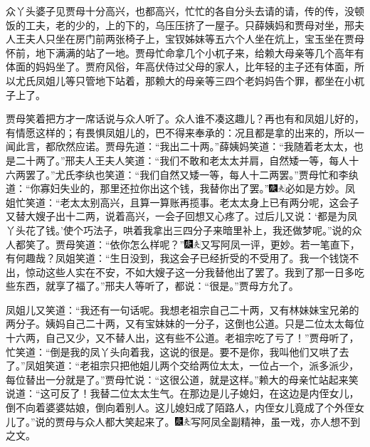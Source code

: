 众丫头婆子见贾母十分高兴，也都高兴，忙忙的各自分头去请的请，传的传，没顿饭的工夫，老的少的，上的下的，乌压压挤了一屋子。只薛姨妈和贾母对坐，邢夫人王夫人只坐在房门前两张椅子上，宝钗姊妹等五六个人坐在炕上，宝玉坐在贾母怀前，地下满满的站了一地。贾母忙命拿几个小杌子来，给赖大母亲等几个高年有体面的妈妈坐了。贾府风俗，年高伏侍过父母的家人，比年轻的主子还有体面，所以尤氏凤姐儿等只管地下站着，那赖大的母亲等三四个老妈妈告个罪，都坐在小杌子上了。

贾母笑着把方才一席话说与众人听了。众人谁不凑这趣儿？再也有和凤姐儿好的，有情愿这样的；有畏惧凤姐儿的，巴不得来奉承的：况且都是拿的出来的，所以一闻此言，都欣然应诺。贾母先道：“我出二十两。”薛姨妈笑道：“我随着老太太，也是二十两了。”邢夫人王夫人笑道：“我们不敢和老太太并肩，自然矮一等，每人十六两罢了。”尤氏李纨也笑道：“我们自然又矮一等，每人十二两罢。”贾母忙和李纨道：“你寡妇失业的，那里还拉你出这个钱，我替你出了罢。”{\includegraphics[width=3mm]{../Images/00004}\includegraphics[width=3mm]{../Images/00012}\footnotesize \kaishu 必如是方妙。}凤姐忙笑道：“老太太别高兴，且算一算账再揽事。老太太身上已有两分呢，这会子又替大嫂子出十二两，说着高兴，一会子回想又心疼了。过后儿又说：‘都是为凤丫头花了钱。’使个巧法子，哄着我拿出三四分子来暗里补上，我还做梦呢。”说的众人都笑了。贾母笑道：“依你怎么样呢？”{\includegraphics[width=3mm]{../Images/00004}\includegraphics[width=3mm]{../Images/00012}\footnotesize \kaishu 又写阿凤一评，更妙。若一笔直下，有何趣哉？}凤姐笑道：“生日没到，我这会子已经折受的不受用了。我一个钱饶不出，惊动这些人实在不安，不如大嫂子这一分我替他出了罢了。我到了那一日多吃些东西，就享了福了。”邢夫人等听了，都说：“很是。”贾母方允了。

凤姐儿又笑道：“我还有一句话呢。我想老祖宗自己二十两，又有林妹妹宝兄弟的两分子。姨妈自己二十两，又有宝妹妹的一分子，这倒也公道。只是二位太太每位十六两，自己又少，又不替人出，这有些不公道。老祖宗吃了亏了！”贾母听了，忙笑道：“倒是我的凤丫头向着我，这说的很是。要不是你，我叫他们又哄了去了。”凤姐笑道：“老祖宗只把他姐儿两个交给两位太太，一位占一个，派多派少，每位替出一分就是了。”贾母忙说：“这很公道，就是这样。”赖大的母亲忙站起来笑说道：“这可反了！我替二位太太生气。在那边是儿子媳妇，在这边是内侄女儿，倒不向着婆婆姑娘，倒向着别人。这儿媳妇成了陌路人，内侄女儿竟成了个外侄女儿了。”说的贾母与众人都大笑起来了。{\includegraphics[width=3mm]{../Images/00004}\includegraphics[width=3mm]{../Images/00012}\footnotesize \kaishu 写阿凤全副精神，虽一戏，亦人想不到之文。}

